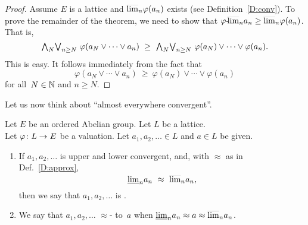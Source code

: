 \documentclass[main.tex]{subfiles}
\begin{document}
\begin{proof}
Assume $E$ is a lattice and $\smash{\overline{\lim}_{n}}\varphi(a_n)$ exists
(see Definition~\ref{D:conv}).
To prove the remainder of the theorem,
we need to show that 
${\varphi}\text{-}\!\smash{\overline{\lim}_{n}}a_n \geq \smash{\overline{\lim}_{n}}\varphi(a_n)$.
That is,
\begin{equation*}
\bw_N \bv_{n\geq N} \ \varphi(a_N \vee \dotsb \vee a_n)
\ \geq \ 
\bw_N \bv_{n\geq N} \ \varphi(a_N) \vee \dotsb \vee \varphi(a_n).
\end{equation*}
This is easy.  It follows immediately
from the fact that
\begin{equation*}
\varphi(a_N\vee \dotsb\vee a_n)
\ \geq\ \varphi(a_N)\vee \dotsb \vee \varphi(a_n)
\end{equation*}
for all~$N\in\mathbb{N}$ and $n\geq N$.
\end{proof}
%
%
\noindent
Let us now think about ``almost everywhere convergent''. 
\begin{dfn}
\label{D:approx-conv}
Let $E$ be an ordered Abelian group.
Let $L$ be a lattice.\\
Let $\varphi\colon L \rightarrow E$ be a valuation.
Let $a_1,a_2,\dotsc \in L$ and $a\in L$ be given.
\begin{enumerate}
\item 
If  $a_1,a_2,\dotsc$
is upper and lower convergent, and,
with  $\approx$ as in Def.~\ref{D:approx},
\begin{equation*}
\smash{\underline{\lim}_{n}} a_n \ \approx\ \smash{\overline{\lim}_{n}}a_n,
\end{equation*}
then we say that
$a_1,a_2,\dotsc$
is .

\item
We say that $a_1,a_2,\dotsc$ $\approx$- to~$a$
when $\smash{\underline{\lim}_{n}}a_n \approx a \approx \smash{\overline{\lim}_{n}}a_n$.
\end{enumerate}
\end{dfn}
%
%
\end{document}
